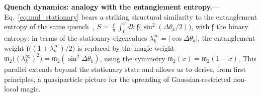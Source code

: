 \documentclass[aps,prl,twocolumn,superscriptaddress,reprint,longbibliography,nofootinbib]{revtex4-2}
\begin{document}
\textbf{Quench dynamics: analogy with the entanglement entropy.}---Eq.~\eqref{eq:mnl_stationary} bears a striking structural similarity to the entanglement entropy of the same quench~\cite{Calabrese2005evolution}, $S=\frac{\ell}{\pi} \int_0^\pi\! dk\; \mathfrak{f}\bigl(\sin^2(\Delta\theta_k/2)\bigr)$, with $\mathfrak{f}$ the binary entropy: in terms of the stationary eigenvalues $\lambda_k^{\infty}=|\cos\Delta\theta_k|$, the entanglement weight $\mathfrak{f}\bigl((1+\lambda_k^{\infty})/2\bigr)$ is replaced by the magic weight $\mathfrak{m}_2\bigl((\lambda_k^{\infty})^2\bigr)=\mathfrak{m}_2(\sin^2\!\Delta\theta_k)$, using the symmetry $\mathfrak{m}_2(x)=\mathfrak{m}_2(1-x)$.
This parallel extends beyond the stationary state and allows us to derive, from first principles, a quasiparticle picture for the spreading of Gaussian-restricted non-local magic.
\end{document}
